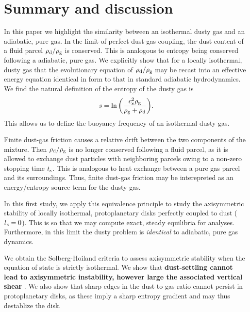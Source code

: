 \section{Summary and discussion}\label{summary}
In this paper we highlight the similarity between an isothermal 
dusty gas and an adiabatic, pure gas. 
In the limit of perfect dust-gas coupling, the dust content of a fluid 
parcel $\rho_\mathrm{d}/\rho_\mathrm{g}$ is conserved. This is analogous to entropy being 
conserved following a adiabatic, pure gas. %
We explicitly show that for 
a locally isothermal, dusty gas that the evolutionary equation of 
$\rho_\mathrm{d}/\rho_\mathrm{g}$ may be recast into an effective energy equation identical
in form to that in standard adiabatic hydrodynamics. We find the 
natural definition of the entropy of the dusty gas is 
\begin{align*}
  s  = \ln{\left(\frac{c_s^2\rho_\mathrm{g}}{\rho_\mathrm{g}+\rho_\mathrm{d}}\right)}.  
\end{align*}
This allows us to define the buoyancy frequency of an isothermal 
dusty gas. 

%

Finite dust-gas friction causes a relative drift between the two
components of the mixture. Then $\rho_\mathrm{d}/\rho_\mathrm{g} $ is no
longer conserved following a fluid parcel, as it is allowed to
exchange dust particles with neighboring parcels owing to a non-zero
stopping time $t_\mathrm{s}$. This is analogous to heat exchange between a 
pure gas parcel and its surroundings. Thus, finite dust-gas friction
may be interepreted as an energy/entropy source term for the dusty
gas.   

%
In this first study, we apply this equivalence principle to study the
axisymmetric stability of locally isothermal, protoplanetary disks
perfectly coupled to dust ($t_\mathrm{s}=0$). This is so that we may 
compute exact, steady equilibria for analyses. Furthermore,
in this limit the dusty problem is \emph{identical} to adiabatic, pure
gas dynamics. 

We obtain the Solberg-Hoiland criteria to assess
axisymmetric stability when the equation of state is strictly
isothermal. We show that {\bf dust-settling cannot lead to
  axisymmetric instability, however large the associated vertical
  shear} \citep[cf. \emph{non-axisymmetric} Kelvin-Helmholtz instabilities
  induced by  dust-settling, ][]{lee10}. We also show that
sharp edges in the dust-to-gas ratio cannot persist in protoplanetary
disks, as these imply a sharp entropy gradient and may thus destablize
the disk. 

